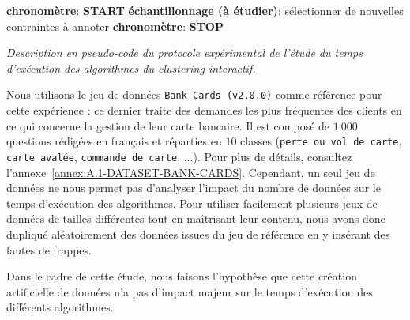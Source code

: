 \begin{algorithm}
{{						\textbf{chronomètre}: \textbf{START} \;
						\textbf{échantillonnage (à étudier)}: sélectionner de nouvelles contraintes à annoter \;
						\textbf{chronomètre}: \textbf{STOP} \;
					}
				}
				\caption{\textit{
					Description en pseudo-code du protocole expérimental de l'étude du temps d'exécution des algorithmes du \textit{clustering} interactif.
				}}
				\label{algorithm:4.3.2-ETUDE-COUTS-TEMPS-CALCUL-PROTOCOLE}
			\end{algorithm}
			
			Nous utilisons le jeu de données \texttt{Bank Cards (v2.0.0)} comme référence pour cette expérience : ce dernier traite des demandes les plus fréquentes des clients en ce qui concerne la gestion de leur carte bancaire.
			Il est composé de $1~000$ questions rédigées en français et réparties en $10$ classes (\texttt{perte ou vol de carte}, \texttt{carte avalée}, \texttt{commande de carte}, ...).
			Pour plus de détails, consultez l'annexe~\ref{annex:A.1-DATASET-BANK-CARDS}.
			Cependant, un seul jeu de données ne nous permet pas d'analyser l'impact du nombre de données sur le temps d'exécution des algorithmes.
			Pour utiliser facilement plusieurs jeux de données de tailles différentes tout en maîtrisant leur contenu, nous avons donc dupliqué aléatoirement des données issues du jeu de référence en y insérant des fautes de frappes.
			
			\begin{leftBarWarning}
				Dans le cadre de cette étude, nous faisons l'hypothèse que cette création artificielle de données n'a pas d'impact majeur sur le temps d'exécution des différents algorithmes.
			\end{leftBarWarning}
			
